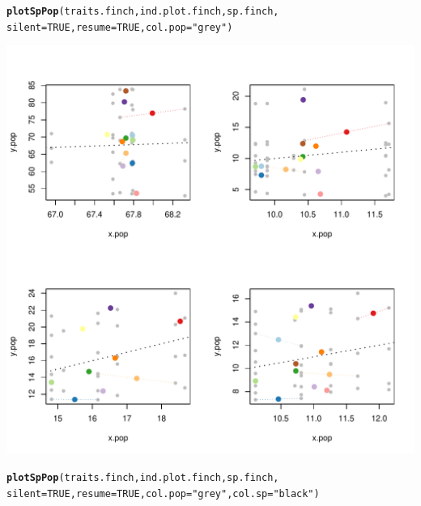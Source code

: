 \documentclass[12pt]{article}\usepackage[]{graphicx}\usepackage[]{color}
\makeatletter
\def\maxwidth{ %
  \ifdim\Gin@nat@width>\linewidth
    \linewidth
  \else
    \Gin@nat@width
  \fi
}
\newcommand{\hlnum}[1]{\textcolor[rgb]{0.686,0.059,0.569}{#1}}%
\newcommand{\hlstr}[1]{\textcolor[rgb]{0.192,0.494,0.8}{#1}}%
\newcommand{\hlstd}[1]{\textcolor[rgb]{0.345,0.345,0.345}{#1}}%
\newcommand{\hlkwc}[1]{\textcolor[rgb]{0.333,0.667,0.333}{#1}}%
\newcommand{\hlkwd}[1]{\textcolor[rgb]{0.737,0.353,0.396}{\textbf{#1}}}%
\newenvironment{kframe}{%
 \def\at@end@of@kframe{}%
 \ifinner\ifhmode%
  \def\at@end@of@kframe{\end{minipage}}%
  \begin{minipage}{\columnwidth}%
 \fi\fi%
 \def\FrameCommand##1{\hskip\@totalleftmargin \hskip-\fboxsep
 \colorbox{shadecolor}{##1}\hskip-\fboxsep
     \hskip-\linewidth \hskip-\@totalleftmargin \hskip\columnwidth}%
 \MakeFramed {\advance\hsize-\width
   \@totalleftmargin\z@ \linewidth\hsize
   \@setminipage}}%
 {\par\unskip\endMakeFramed%
 \at@end@of@kframe}
\newenvironment{knitrout}{}{} %
\makeatother
\begin{document}
\begin{knitrout}
\color{fgcolor}\begin{kframe}
\begin{alltt}
\hlkwd{plotSpPop}\hlstd{(traits.finch, ind.plot.finch, sp.finch,}
           \hlkwc{silent}\hlstd{=}\hlnum{TRUE}\hlstd{,} \hlkwc{resume}\hlstd{=}\hlnum{TRUE}\hlstd{,} \hlkwc{col.pop}\hlstd{=}\hlstr{"grey"}\hlstd{)}
\end{alltt}
\end{kframe}
\includegraphics[width=\maxwidth]{figure/unnamed-chunk-271} 
\begin{kframe}\begin{alltt}
\hlkwd{plotSpPop}\hlstd{(traits.finch, ind.plot.finch, sp.finch,}
           \hlkwc{silent}\hlstd{=}\hlnum{TRUE}\hlstd{,} \hlkwc{resume}\hlstd{=}\hlnum{TRUE}\hlstd{,} \hlkwc{col.pop}\hlstd{=}\hlstr{"grey"}\hlstd{,} \hlkwc{col.sp}\hlstd{=}\hlstr{"black"}\hlstd{)}
\end{alltt}
\end{kframe}

\end{knitrout}
\end{document}
